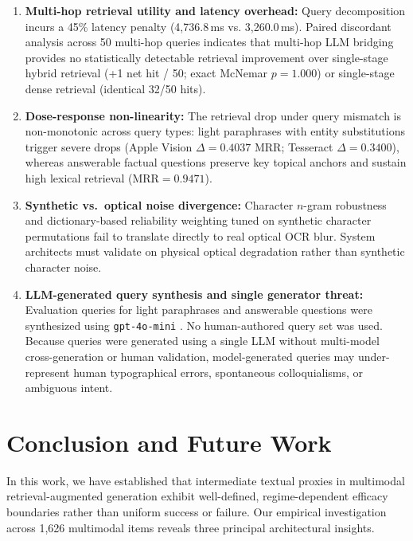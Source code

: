 \documentclass[conference]{IEEEtran}
\begin{document}
\begin{enumerate}
    \item \textbf{Multi-hop retrieval utility and latency overhead:} Query decomposition incurs a 45\% latency penalty (4,736.8\,ms vs. 3,260.0\,ms). Paired discordant analysis across 50 multi-hop queries indicates that multi-hop LLM bridging provides no statistically detectable retrieval improvement over single-stage hybrid retrieval (+1 net hit / 50; exact McNemar $p = 1.000$) or single-stage dense retrieval (identical 32/50 hits).
    \item \textbf{Dose-response non-linearity:} The retrieval drop under query mismatch is non-monotonic across query types: light paraphrases with entity substitutions trigger severe drops (Apple Vision $\Delta = 0.4037$ MRR; Tesseract $\Delta = 0.3400$), whereas answerable factual questions preserve key topical anchors and sustain high lexical retrieval ($\text{MRR} = 0.9471$).
    \item \textbf{Synthetic vs.\ optical noise divergence:} Character $n$-gram robustness and dictionary-based reliability weighting tuned on synthetic character permutations fail to translate directly to real optical OCR blur. System architects must validate on physical optical degradation rather than synthetic character noise.
    \item \textbf{LLM-generated query synthesis and single generator threat:} Evaluation queries for light paraphrases and answerable questions were synthesized using \texttt{gpt-4o-mini} \cite{openai2024gpt4o}. No human-authored query set was used. Because queries were generated using a single LLM without multi-model cross-generation or human validation, model-generated queries may under-represent human typographical errors, spontaneous colloquialisms, or ambiguous intent.
\end{enumerate}

\section{Conclusion and Future Work}
\label{sec:conclusion}
In this work, we have established that intermediate textual proxies in multimodal retrieval-augmented generation exhibit well-defined, regime-dependent efficacy boundaries rather than uniform success or failure. Our empirical investigation across 1,626 multimodal items reveals three principal architectural insights.
\end{document}
